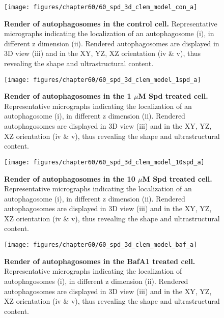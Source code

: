 \begin{figure}[!htbp]
\center
 \texttt{[image: figures/chapter60/60\_spd\_3d\_clem\_model\_con\_a]}
 \caption[Render of autophagosomes in the control cell]{\textbf{Render of autophagosomes in the control cell.} Representative micrographs indicating the localization of an autophagosome (i), in different z dimension (ii). Rendered autophagosomes are displayed in 3D view (iii) and in the XY, YZ, XZ orientation (iv \& v), thus revealing the shape and ultrastructural content.}
 \label{fig:60_spd_3d_clem_model_con_a}
\end{figure} 

\begin{figure}[!htbp]
\center
 \texttt{[image: figures/chapter60/60\_spd\_3d\_clem\_model\_1spd\_a]}
 \caption[Render of autophagosomes in the 1 $\mu$M Spd treated cell]{\textbf{Render of autophagosomes in the 1 $\mu$M Spd treated cell.} Representative micrographs indicating the localization of an autophagosome (i), in different z dimension (ii). Rendered autophagosomes are displayed in 3D view (iii) and in the XY, YZ, XZ orientation (iv \& v), thus revealing the shape and ultrastructural content.}
 \label{fig:60_spd_3d_clem_model_1spd_a}
\end{figure} 

\begin{figure}[!htbp]
\center
 \texttt{[image: figures/chapter60/60\_spd\_3d\_clem\_model\_10spd\_a]}
 \caption[Render of autophagosomes in the 10 $\mu$M Spd treated cell]{\textbf{Render of autophagosomes in the 10 $\mu$M Spd treated cell.} Representative micrographs indicating the localization of an autophagosome (i), in different z dimension (ii). Rendered autophagosomes are displayed in 3D view (iii) and in the XY, YZ, XZ orientation (iv \& v), thus revealing the shape and ultrastructural content.}
 \label{fig:60_spd_3d_clem_model_10spd_a}
\end{figure} 

\begin{figure}[!htbp]
\center
 \texttt{[image: figures/chapter60/60\_spd\_3d\_clem\_model\_baf\_a]}
 \caption[Render of autophagosomes in the BafA1 treated cell]{\textbf{Render of autophagosomes in the BafA1 treated cell.} Representative micrographs indicating the localization of autophagosomes (i), in different z dimension (ii). Rendered autophagosomes are displayed in 3D view (iii) and in the XY, YZ, XZ orientation (iv \& v), thus revealing the shape and ultrastructural content.}
 \label{fig:60_spd_3d_clem_model_baf_a}
\end{figure} 


